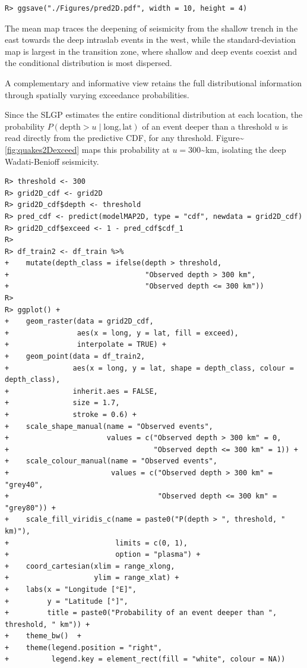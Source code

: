 \documentclass[
]{article}
\begin{document}
\begin{verbatim}
R> ggsave("./Figures/pred2D.pdf", width = 10, height = 4)
\end{verbatim}

The mean map traces the deepening of seismicity from the shallow trench in the east towards the deep intraslab events in the west, while the standard-deviation map is largest in the transition zone, where shallow and deep events coexist and the conditional distribution is most dispersed.

A complementary and informative view retains the full distributional information through spatially varying exceedance probabilities.

Since the SLGP estimates the entire conditional distribution at each location, the probability \(P(\text{depth} > u \mid \text{long}, \text{lat})\) of an event deeper than a threshold \(u\) is read directly from the predictive CDF, for any threshold. Figure\textasciitilde{}\ref{fig:quakes2Dexceed} maps this probability at \(u = 300\)\textasciitilde km, isolating the deep Wadati-Benioff seismicity.

\begin{verbatim}
R> threshold <- 300
R> grid2D_cdf <- grid2D
R> grid2D_cdf$depth <- threshold
R> pred_cdf <- predict(modelMAP2D, type = "cdf", newdata = grid2D_cdf)
R> grid2D_cdf$exceed <- 1 - pred_cdf$cdf_1
R> 
R> df_train2 <- df_train %>%
+    mutate(depth_class = ifelse(depth > threshold,
+                                "Observed depth > 300 km",
+                                "Observed depth <= 300 km"))
R> 
R> ggplot() +
+    geom_raster(data = grid2D_cdf,
+                aes(x = long, y = lat, fill = exceed),
+                interpolate = TRUE) +
+    geom_point(data = df_train2,
+               aes(x = long, y = lat, shape = depth_class, colour = depth_class),
+               inherit.aes = FALSE,
+               size = 1.7,
+               stroke = 0.6) +
+    scale_shape_manual(name = "Observed events",
+                       values = c("Observed depth > 300 km" = 0,
+                                  "Observed depth <= 300 km" = 1)) +
+    scale_colour_manual(name = "Observed events",
+                        values = c("Observed depth > 300 km" = "grey40",
+                                   "Observed depth <= 300 km" = "grey80")) +
+    scale_fill_viridis_c(name = paste0("P(depth > ", threshold, " km)"),
+                         limits = c(0, 1),
+                         option = "plasma") +
+    coord_cartesian(xlim = range_xlong,
+                    ylim = range_xlat) +
+    labs(x = "Longitude [°E]",
+         y = "Latitude [°]",
+         title = paste0("Probability of an event deeper than ", threshold, " km")) +
+    theme_bw()  +
+    theme(legend.position = "right",
+          legend.key = element_rect(fill = "white", colour = NA))
\end{verbatim}
\end{document}
